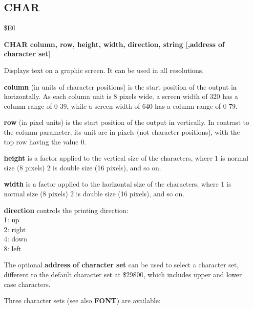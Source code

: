 
\newpage
\subsection{CHAR}
\begin{description}[leftmargin=2cm,style=nextline]
\item [Token:] \$E0
\item [Format:] {\bf CHAR column, row, height, width, direction, string
                [,address of character set]}
\item [Usage:]  Displays text on a graphic screen.
                It can be used in all resolutions.

                {\bf column} (in units of character positions) is the
                start position of the output in horizontally.
                As each column unit is 8 pixels wide, a screen width of 320
                has a column range of 0-39, while a screen width of 640
                has a column range of 0-79.

                {\bf row} (in pixel units) is the start position of the output
                in vertically. In contrast to the column parameter,
                its unit are in pixels (not character positions), with the top
                row having the value 0.

                {\bf height} is a factor applied to the vertical
                size of the characters, where 1 is normal size (8 pixels)
                2 is double size (16 pixels), and so on.

                {\bf width} is a factor applied to the horizontal
                size of the characters, where 1 is normal size (8 pixels)
                2 is double size (16 pixels), and so on.

                {\bf direction} controls the printing direction: \\
                1: up     \\
                2: right  \\
                4: down   \\
                8: left

                The optional {\bf address of character set} can be used
                to select a character set, different to the default
                character set at \$29800, which includes upper and lower case
                characters.

                Three character sets (see also {\bf FONT}) are available:


\end{description}
